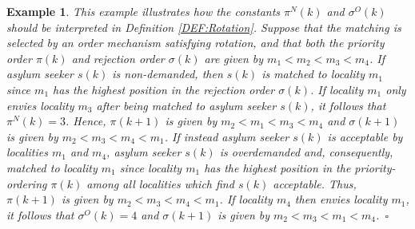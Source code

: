 \documentclass[12pt,fleqn]{article}
\newtheorem{example}{Example}
\begin{document}
\begin{example}\rm\label{EX:Rotation}
This example illustrates how the constants $\pi^N(k)$ and $\sigma^O(k)$ should be interpreted in Definition \ref{DEF:Rotation}. Suppose that the matching is selected by an order mechanism satisfying rotation, and that both the priority order $\pi(k)$ and rejection order $\sigma(k)$ are given by $m_1<m_2<m_3<m_4$. If asylum seeker $s(k)$ is non-demanded, then $s(k)$ is matched to locality $m_1$ since $m_1$ has the highest position in the rejection order $\sigma(k)$. If locality $m_1$ only envies locality $m_3$ after being matched to asylum seeker $s(k)$, it follows that $\pi^N(k)=3$. Hence, $\pi(k+1)$ is given by $m_2<m_1<m_3<m_4$ and $\sigma(k+1)$ is given by $m_2<m_3<m_4<m_1$. If instead asylum seeker $s(k)$ is acceptable by localities $m_1$ and $m_4$, asylum seeker $s(k)$ is overdemanded and, consequently, matched to locality $m_1$ since locality $m_1$ has the highest position in the priority-ordering $\pi(k)$ among all localities which find $s(k)$ acceptable. Thus, $\pi(k+1)$ is given by $m_2<m_3<m_4<m_1$. If locality $m_4$ then envies locality $m_1$, it follows that $\sigma^O(k)=4$ and $\sigma(k+1)$ is given by $m_2<m_3<m_1<m_4$.~\hfill$\square$
\end{example}
\end{document}

